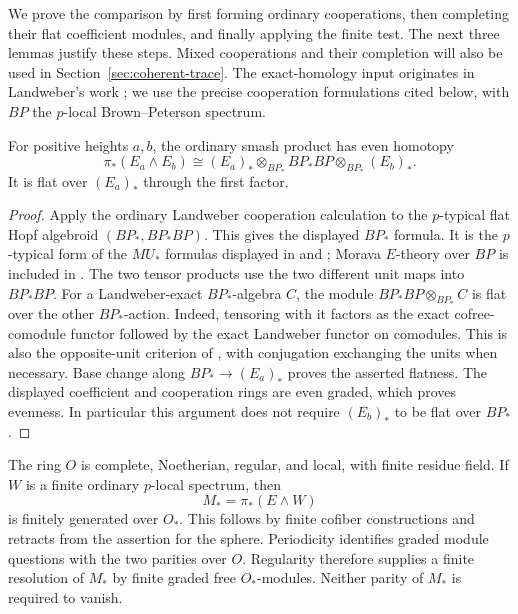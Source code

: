 We prove the comparison by first forming ordinary cooperations, then
completing their flat coefficient modules, and finally applying the
finite test. The next three lemmas justify these steps. Mixed
cooperations and their completion will also be used in
Section~\ref{sec:coherent-trace}.
The exact-homology input originates in Landweber's work
\cite{landweber1976}; we use the precise cooperation formulations cited
below, with $BP$ the $p$-local Brown--Peterson spectrum.

\begin{lemma}\label{wup:mixed-flat}
For positive heights \(a,b\), the ordinary smash product has even
homotopy
\[
 \pi_*(E_a\wedge E_b)\cong
 (E_a)_*\otimes_{BP_*}BP_*BP\otimes_{BP_*}(E_b)_*.
\]
It is flat over \((E_a)_*\) through the first factor.
\end{lemma}

\begin{proof}
Apply the ordinary Landweber cooperation calculation to the $p$-typical
flat Hopf algebroid $(BP_*,BP_*BP)$. This gives the displayed $BP_*$
formula. It is the $p$-typical form of the $MU_*$ formulas displayed in
\cite[Section~15, Proposition~15.1 and Corollary~15.4]{rezk1998} and
\cite[Lemma~4.4]{hovey2004}; Morava $E$-theory over $BP$ is included in
\cite[Example~0.1(d)]{hs-comodules2003}.
The two tensor products use the two different unit maps into \(BP_*BP\).
For a Landweber-exact \(BP_*\)-algebra \(C\), the module
\(BP_*BP\otimes_{BP_*}C\) is flat over the other \(BP_*\)-action.
Indeed, tensoring with it factors as the exact cofree-comodule functor
followed by the exact Landweber functor on comodules. This is also the
opposite-unit criterion of
\cite[Lemma~2.2]{hs-comodules2003}, with conjugation exchanging the
units when necessary. Base change along \(BP_*\to(E_a)_*\) proves the
asserted flatness. The displayed coefficient and cooperation rings are
even graded, which proves evenness. In particular this argument does
not require \((E_b)_*\) to be flat over \(BP_*\).
\end{proof}

The ring \(O\) is complete, Noetherian, regular, and local, with finite
residue field. If \(W\) is a finite ordinary \(p\)-local spectrum, then
\[
 M_*=\pi_*(E\wedge W)
\]
is finitely generated over \(O_*\). This follows by finite cofiber
constructions and retracts from the assertion for the sphere.
Periodicity identifies graded module questions with the two parities
over \(O\). Regularity therefore supplies a finite resolution
\cite[Tag~00O7]{stacks} of
\(M_*\) by finite graded free \(O_*\)-modules. Neither parity of
\(M_*\) is required to vanish.

